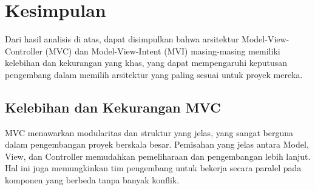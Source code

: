\documentclass[conference]{IEEEtran}
\begin{document}
\newpage

\section{Kesimpulan}
Dari hasil analisis di atas, dapat disimpulkan bahwa arsitektur Model-View-Controller (MVC) dan Model-View-Intent (MVI) masing-masing memiliki kelebihan dan kekurangan yang khas, yang dapat mempengaruhi keputusan pengembang dalam memilih arsitektur yang paling sesuai untuk proyek mereka.

\subsection{Kelebihan dan Kekurangan MVC}

MVC menawarkan modularitas dan struktur yang jelas, yang sangat berguna dalam pengembangan proyek berskala besar. Pemisahan yang jelas antara Model, View, dan Controller memudahkan pemeliharaan dan pengembangan lebih lanjut. Hal ini juga memungkinkan tim pengembang untuk bekerja secara paralel pada komponen yang berbeda tanpa banyak konflik.
\end{document}
